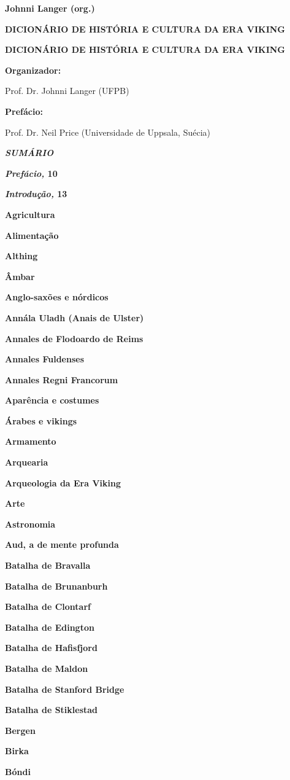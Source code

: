 \textbf{Johnni Langer (org.)}

\textbf{DICIONÁRIO DE HISTÓRIA E CULTURA DA ERA VIKING}

\textbf{DICIONÁRIO DE HISTÓRIA E CULTURA DA ERA VIKING}

\textbf{Organizador:}

Prof. Dr. Johnni Langer (UFPB)

\textbf{Prefácio:}

Prof. Dr. Neil Price (Universidade de Uppsala, Suécia)

\textbf{\emph{SUMÁRIO}}

\textbf{\emph{Prefácio,} 10}

\textbf{\emph{Introdução,} 13}

\textbf{Agricultura}

\textbf{Alimentação}

\textbf{Althing}

\textbf{Âmbar}

\textbf{Anglo-saxões e nórdicos}

\textbf{Annála Uladh (Anais de Ulster)}

\textbf{Annales de Flodoardo de Reims}

\textbf{Annales Fuldenses}

\textbf{Annales Regni Francorum}

\textbf{Aparência e costumes}

\textbf{Árabes e vikings}

\textbf{Armamento}

\textbf{Arquearia}

\textbf{Arqueologia da Era Viking}

\textbf{Arte}

\textbf{Astronomia}

\textbf{Aud, a de mente profunda}

\textbf{Batalha de Bravalla}

\textbf{Batalha de Brunanburh}

\textbf{Batalha de Clontarf}

\textbf{Batalha de Edington}

\textbf{Batalha de Hafisfjord}

\textbf{Batalha de Maldon}

\textbf{Batalha de Stanford Bridge}

\textbf{Batalha de Stiklestad}

\textbf{Bergen}

\textbf{Birka}

\textbf{Bóndi}

